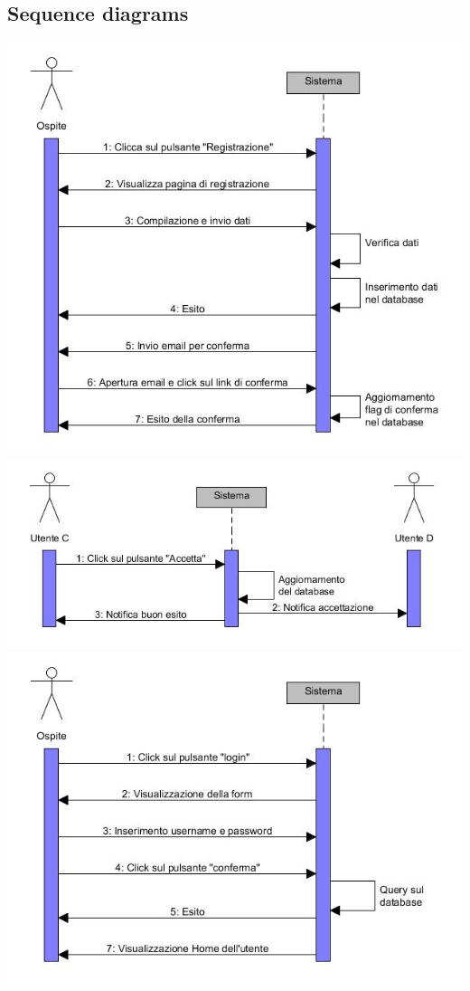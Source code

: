 \documentclass[a4paper,12pt]{article}
\begin{document}
\subsection{Sequence diagrams}
\begin{center}
\includegraphics[scale=0.75]{sDiagrams/creazioneUtente.jpg}
\vspace*{\fill}
\includegraphics[scale=0.75]{sDiagrams/accettazioneAmicizia.jpg} \\
\clearpage
\includegraphics[scale=0.75]{sDiagrams/login.jpg} \\

\end{center}
\end{document}

